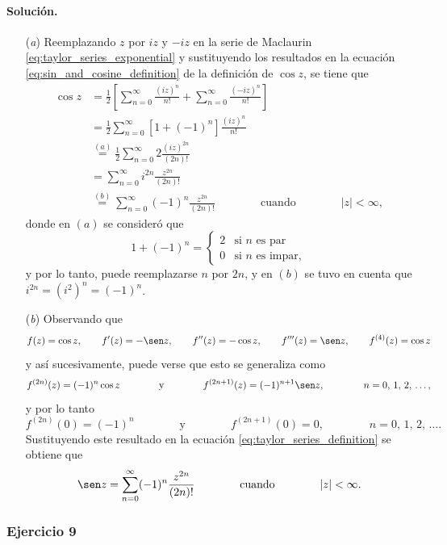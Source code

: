 \documentclass[a4paper]{report}
\begin{document}
\paragraph{Solución.} 
\begin{enumerate}
 \item[(\textit{a})] Reemplazando \(z\) por \(iz\) y \(-iz\) en la serie de Maclaurin \ref{eq:taylor_series_exponential} y sustituyendo los resultados en la ecuación \ref{eq:sin_and_cosine_definition} de la definición de \(\cos z\), se tiene que 
 \begin{align*}
  \cos z&=\frac{1}{2}\left[\sum_{n=0}^\infty\frac{(iz)^n}{n!}+\sum_{n=0}^\infty\frac{(-iz)^n}{n!}\right]\\
   &=\frac{1}{2}\sum_{n=0}^\infty[1+(-1)^n]\frac{(iz)^n}{n!}\\
   &\overset{(a)}{=}\frac{1}{2}\sum_{n=0}^\infty2\frac{(iz)^{2n}}{(2n)!}\\
   &=\sum_{n=0}^\infty i^{2n}\frac{z^{2n}}{(2n)!}\\
   &\overset{(b)}{=}\sum_{n=0}^\infty(-1)^n\frac{z^{2n}}{(2n)!}
   \qquad\qquad\textrm{cuando}\qquad\qquad
   |z|<\infty,
 \end{align*}
 donde en \((a)\) se consideró que 
 \[
  1+(-1)^n=
  \left\{ 
  \begin{array}{ll}
   2 & \textrm{si }n\textrm{ es par}\\
   0 & \textrm{si }n\textrm{ es impar},
  \end{array}\right.
 \]
 y por lo tanto, puede reemplazarse \(n\) por \(2n\), y en \((b)\) se tuvo en cuenta que \(i^{2n}=(i^2)^n=(-1)^n\).
 \item[(\textit{b})]  Observando que 
\[
 f(z)=\cos z,\qquad 
 f'(z)=-\sen z,\qquad
 f''(z)=-\cos z,\qquad
 f'''(z)=\sen z,\qquad
 f^{(4)}(z)=\cos z
\]
y así sucesivamente, puede verse que esto se generaliza como
\[
 f^{(2n)}(z)=(-1)^n\cos z
 \qquad\qquad\textrm{y}\qquad\qquad
 f^{(2n+1)}(z)=(-1)^{n+1}\sen z,
 \qquad\qquad 
 n=0,\,1,\,2,\,\dots,
\]
y por lo tanto
\[
 f^{(2n)}(0)=(-1)^n
 \qquad\qquad\textrm{y}\qquad\qquad
 f^{(2n+1)}(0)=0,
 \qquad\qquad 
 n=0,\,1,\,2,\,\dots.
\]
Sustituyendo este resultado en la ecuación \ref{eq:taylor_series_definition} se obtiene que 
\[
 \sen z=\sum_{n=0}^\infty(-1)^n\frac{z^{2n}}{(2n)!}
 \qquad\qquad\textrm{cuando}\qquad\qquad
 |z|<\infty.
\]
\end{enumerate}

\subsubsection*{Ejercicio 9}
\end{document}
